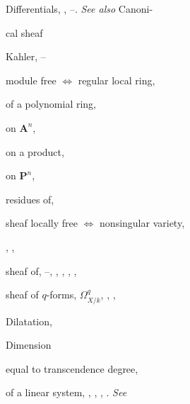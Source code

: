 {{\noindent\hspace*{0.0bp}Differentials, , --. \emph{See also} Canoni-\par
\noindent\hspace*{15.0bp}cal sheaf\par
\noindent\hspace*{7.5bp}Kahler, --\par
\noindent\hspace*{7.5bp}module free $\Leftrightarrow$ regular local ring, \par
\noindent\hspace*{7.5bp}of a polynomial ring, \par
\noindent\hspace*{7.5bp}on $\mathbf A^n$, \par
\noindent\hspace*{7.5bp}on a product, \par
\noindent\hspace*{7.5bp}on $\mathbf P^n$, \par
\noindent\hspace*{7.5bp}residues of, \par
\noindent\hspace*{7.5bp}sheaf locally free $\Leftrightarrow$ nonsingular variety,\par
\noindent\hspace*{15.0bp}, , \par
\noindent\hspace*{7.5bp}sheaf of, --, , , , , \par
\noindent\hspace*{7.5bp}sheaf of $q$-forms, $\Omega^q_{X/k}$, , , \par
\noindent\hspace*{0.0bp}Dilatation, \par
\noindent\hspace*{0.0bp}Dimension\par
\noindent\hspace*{7.5bp}equal to transcendence degree, \par
\noindent\hspace*{7.5bp}of a linear system, , , , . \emph{See}\par
}}
